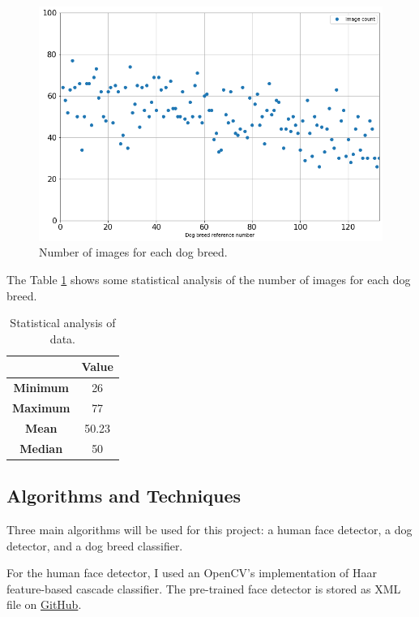 \documentclass{article}
\begin{document}
    \begin{figure}[htbp]
        \centering
        \includegraphics[width=\linewidth]{img/image_count.png}
        \caption{Number of images for each dog breed.}
        \label{fig:image_count}
    \end{figure}
    
    The Table \ref{tab:statistics} shows some statistical analysis of the number of images for each dog breed.

    \begin{table}[htbp]
        \centering
        \begin{tabular}{c|c}
             & \textbf{Value} \\
            \hline
            \textbf{Minimum} & 26 \\
            \textbf{Maximum} & 77 \\
            \textbf{Mean} & 50.23 \\
            \textbf{Median} & 50 \\
        \end{tabular}
        \caption{Statistical analysis of data.}
        \label{tab:statistics}
    \end{table}

    \subsection{Algorithms and Techniques}
    
    Three main algorithms will be used for this project: a human face detector, a dog detector, and a dog breed classifier.
    
    For the human face detector, I used an OpenCV's implementation of Haar feature-based cascade classifier. The pre-trained face detector is stored as XML file on \href{https://github.com/opencv/opencv/tree/master/data/haarcascades}{GitHub}.
\end{document}
